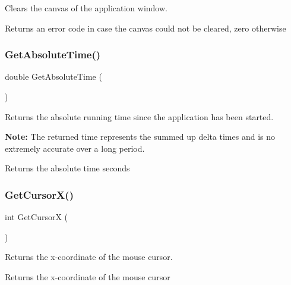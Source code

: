 Clears the canvas of the application window.

\begin{DoxyReturn}{Returns}
an error code in case the canvas could not be cleared, zero otherwise 
\end{DoxyReturn}
\mbox{\label{group__sdl__group_ga9b9387d774c6bc63e5e3c6c91296dedb}} 
\subsubsection{\texorpdfstring{Get\+Absolute\+Time()}{GetAbsoluteTime()}}
{\footnotesize\ttfamily double Get\+Absolute\+Time (\begin{DoxyParamCaption}{ }\end{DoxyParamCaption})}

Returns the absolute running time since the application has been started.

{\bfseries Note\+:} The returned time represents the summed up delta times and is no extremely accurate over a long period.

\begin{DoxyReturn}{Returns}
the absolute time seconds 
\end{DoxyReturn}
\mbox{\label{group__sdl__group_ga7c508c83150dcd127156d9c4e2436a8e}} 
\subsubsection{\texorpdfstring{Get\+Cursor\+X()}{GetCursorX()}}
{\footnotesize\ttfamily int Get\+CursorX (\begin{DoxyParamCaption}{ }\end{DoxyParamCaption})}

Returns the x-\/coordinate of the mouse cursor.

\begin{DoxyReturn}{Returns}
the x-\/coordinate of the mouse cursor 
\end{DoxyReturn}
\mbox{\label{group__sdl__group_ga4769e37502d12fbc431ace1a32749bc8}} 
